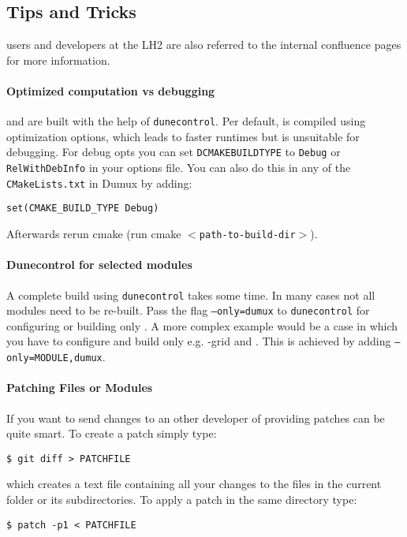 \subsection{Tips and Tricks}
\Dumux users and developers at the LH2 are also referred to the internal confluence pages for
more information.

\paragraph{Optimized computation vs debugging}
\Dune and \Dumux are built with the help of \texttt{dunecontrol}.
Per default, \Dumux is compiled using optimization options, which leads to faster runtimes but is unsuitable
for debugging. For debug opts you can set \texttt{DCMAKE\textunderscore BUILD\textunderscore TYPE} to \texttt{Debug} or \texttt{RelWithDebInfo}
in your options file. You can also do this in any of the \texttt{CMakeLists.txt} in Dumux by adding:

\begin{lstlisting}[style=Shell]
set(CMAKE_BUILD_TYPE Debug)
\end{lstlisting}

Afterwards rerun cmake (run cmake \texttt{$<$path-to-build-dir$>$}).

\paragraph{Dunecontrol for selected modules}
A complete build using \texttt{dunecontrol} takes some time. In many cases not all modules need to be re-built.
Pass the flag \texttt{--only=dumux} to \texttt{dunecontrol} for configuring or building only \Dumux. A more
complex example would be a case in which you have to configure and build only e.g. \Dune{}-grid
and \Dumux. This is achieved by adding \texttt{--only=MODULE,dumux}.

\paragraph{Patching Files or Modules}
If you want to send changes to an other developer of \Dumux providing patches
can be quite smart. To create a patch simply type:
\begin{lstlisting}[style=Bash]
$ git diff > PATCHFILE
\end{lstlisting}
\noindent which creates a text file containing all your changes to the files
in the current folder or its subdirectories.
To apply a patch in the same directory type:
\begin{lstlisting}[style=Bash]
$ patch -p1 < PATCHFILE
\end{lstlisting}

